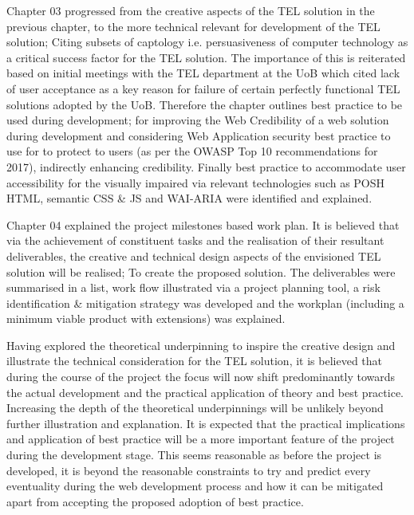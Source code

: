 Chapter 03 progressed from the creative aspects of the TEL solution in the previous chapter, to the more technical relevant for development of the TEL solution; Citing subsets of captology i.e. persuasiveness of computer technology as a critical success factor for the TEL solution. The importance of this is reiterated based on initial meetings with the TEL department at the UoB which cited lack of user acceptance as a key reason for failure of certain perfectly functional TEL solutions adopted by the UoB. Therefore the chapter outlines best practice to be used during development; for improving the Web Credibility of a web solution during development and considering Web Application security best practice to use for to protect to users (as per the OWASP Top 10 recommendations for 2017), indirectly enhancing credibility. Finally best practice to accommodate user accessibility for the visually impaired via relevant technologies such as POSH HTML, semantic CSS \& JS and WAI-ARIA were identified and explained.

Chapter 04 explained the project milestones based work plan. It is believed that via the achievement of constituent tasks and the realisation of their resultant deliverables, the creative and technical design aspects of the envisioned TEL solution will be realised; To create the proposed solution. The deliverables were summarised in a list, work flow illustrated via a project planning tool, a risk identification \& mitigation strategy was developed and the workplan (including a minimum viable product with extensions) was explained.

Having explored the theoretical underpinning to inspire the creative design and illustrate the technical consideration for the TEL solution, it is believed that during the course of the project the focus will now shift predominantly towards the actual development and the practical application of theory and best practice. Increasing the depth of the theoretical underpinnings will be unlikely beyond further illustration and explanation. It is expected that the practical implications and application of best practice will be a more important feature of the project during the development stage. This seems reasonable as before the project is developed, it is beyond the reasonable constraints to try and predict every eventuality during the web development process and how it can be mitigated apart from accepting the proposed adoption of  best practice.